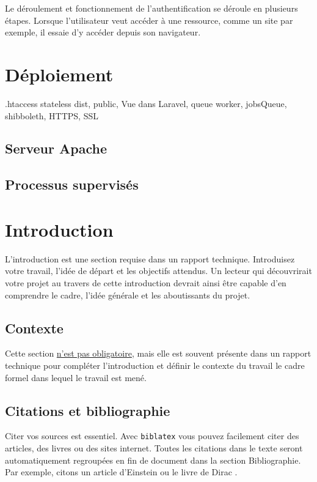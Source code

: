 \documentclass[
    iai, %
    eai, %
]{heig-tb}
\begin{document}
Le déroulement et fonctionnement de l'authentification se déroule en plusieurs étapes.
Lorsque l'utilisateur veut accéder à une ressource, comme un site par exemple, il essaie d'y accéder depuis son navigateur.



\chapter{Déploiement}
.htaccess
stateless
dist, public, Vue dans Laravel, queue worker, jobsQueue, shibboleth, HTTPS, SSL
\section{Serveur Apache}
\section{Processus supervisés}




\chapter{Introduction}
L'introduction est une section requise dans un rapport technique. Introduisez votre travail, l'idée de départ et les objectifs attendus. Un lecteur qui découvrirait votre projet au travers de cette introduction devrait ainsi être capable d'en comprendre le cadre, l'idée générale et les aboutissants du projet.

\section{Contexte}
Cette section \underline{n'est pas obligatoire}, mais elle est souvent présente dans un rapport technique pour compléter l'introduction et définir le contexte du travail \cad le cadre formel dans lequel le travail est mené.

\section{Citations et bibliographie}
Citer vos sources est essentiel. Avec \texttt{biblatex} vous pouvez facilement citer des articles, des livres ou des sites internet. Toutes les citations dans le texte seront automatiquement regroupées en fin de document dans la section \guillemotleft Bibliographie\guillemotright. Par exemple, citons un article d'Einstein \cite{einstein} ou le livre de Dirac \cite{dirac}.
\end{document}
